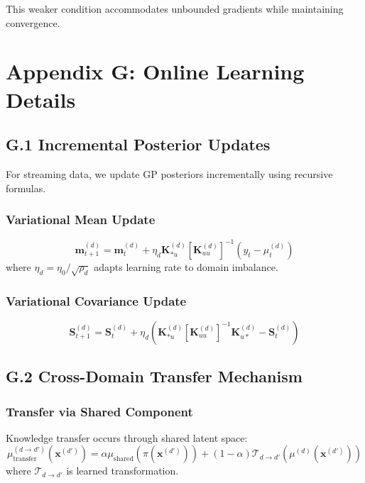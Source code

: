 \documentclass[12pt]{article}
\begin{document}
This weaker condition accommodates unbounded gradients while maintaining convergence.

\section{Appendix G: Online Learning Details}

\subsection{G.1 Incremental Posterior Updates}

For streaming data, we update GP posteriors incrementally using recursive formulas.

\subsubsection{Variational Mean Update}
\begin{equation}
\mathbf{m}_{t+1}^{(d)} = \mathbf{m}_t^{(d)} + \eta_d \mathbf{K}_{*u}^{(d)}[\mathbf{K}_{uu}^{(d)}]^{-1}(y_t - \mu_t^{(d)})
\end{equation}
where $\eta_d = \eta_0/\sqrt{\rho_d}$ adapts learning rate to domain imbalance.

\subsubsection{Variational Covariance Update}
\begin{equation}
\mathbf{S}_{t+1}^{(d)} = \mathbf{S}_t^{(d)} + \eta_d \left(\mathbf{K}_{*u}^{(d)}[\mathbf{K}_{uu}^{(d)}]^{-1}\mathbf{K}_{u*}^{(d)} - \mathbf{S}_t^{(d)}\right)
\end{equation}

\subsection{G.2 Cross-Domain Transfer Mechanism}

\subsubsection{Transfer via Shared Component}
Knowledge transfer occurs through shared latent space:
\begin{equation}
\mu_{\text{transfer}}^{(d \to d')}(\mathbf{x}^{(d')}) = \alpha \mu_{\text{shared}}(\pi(\mathbf{x}^{(d')})) + (1-\alpha) \mathcal{T}_{d \to d'}(\mu^{(d)}(\mathbf{x}^{(d')}))
\end{equation}
where $\mathcal{T}_{d \to d'}$ is learned transformation.
\end{document}
